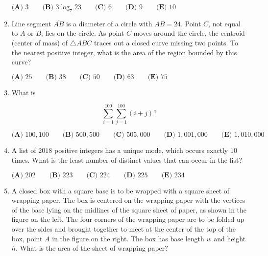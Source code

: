 \documentclass{article}
\begin{document}
\begin{enumerate}[label=\arabic*., itemsep=0.5em]
$\textbf{(A) } 3 \qquad \textbf{(B) } 3\log_{7}23 \qquad \textbf{(C) } 6 \qquad \textbf{(D) } 9 \qquad \textbf{(E) } 10 $\par \vspace{0.5em}\item Line segment $\overline{AB}$ is a diameter of a circle with $AB = 24$. Point $C$, not equal to $A$ or $B$, lies on the circle. As point $C$ moves around the circle, the centroid (center of mass) of $\triangle ABC$ traces out a closed curve missing two points. To the nearest positive integer, what is the area of the region bounded by this curve?

$\textbf{(A) } 25 \qquad \textbf{(B) } 38  \qquad \textbf{(C) } 50  \qquad \textbf{(D) } 63 \qquad \textbf{(E) } 75  $\par \vspace{0.5em}\item What is

\begin{equation*}
\sum^{100}_{i=1} \sum^{100}_{j=1} (i+j) ?
\end{equation*}


$ \textbf{(A) }100{,}100 \qquad
\textbf{(B) }500{,}500\qquad
\textbf{(C) }505{,}000 \qquad
\textbf{(D) }1{,}001{,}000 \qquad
\textbf{(E) }1{,}010{,}000 \qquad $\par \vspace{0.5em}\item A list of $2018$ positive integers has a unique mode, which occurs exactly $10$ times. What is the least number of distinct values that can occur in the list?

$ \textbf{(A) }202 \qquad
\textbf{(B) }223 \qquad
\textbf{(C) }224 \qquad
\textbf{(D) }225 \qquad
\textbf{(E) }234 \qquad $\par \vspace{0.5em}\item A closed box with a square base is to be wrapped with a square sheet of wrapping paper. The box is centered on the wrapping paper with the vertices of the base lying on the midlines of the square sheet of paper, as shown in the figure on the left. The four corners of the wrapping paper are to be folded up over the sides and brought together to meet at the center of the top of the box, point $A$ in the figure on the right. The box has base length $w$ and height $h$. What is the area of the sheet of wrapping paper?



\end{enumerate}
\end{document}
